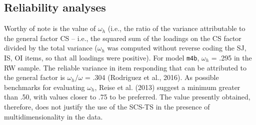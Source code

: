 \documentclass[
  man]{apa7}
\begin{document}
\hypertarget{reliability-analyses}{%
\subsection{Reliability analyses}\label{reliability-analyses}}

Worthy of note is the value of \(\omega_h\) (i.e., the ratio of the variance attributable to the general factor CS -- i.e., the squared sum of the loadings on the CS factor divided by the total variance (\(\omega_h\) was computed without reverse coding the SJ, IS, OI items, so that all loadings were positive). For model \texttt{m4b}, \(\omega_h\) = .295 in the RW sample. The reliable variance in item responding that can be attributed to the general factor is \(\omega_h / \omega\) = .304 (Rodriguez et al., 2016). As possible benchmarks for evaluating \(\omega_h\), Reise et al. (2013) suggest a minimum greater than .50, with values closer to .75 to be preferred. The value presently obtained, therefore, does not justify the use of the SCS-TS in the presence of multidimensionality in the data.

\hfill\break
\end{document}

